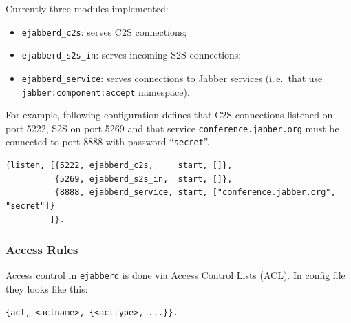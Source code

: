 \documentclass[10pt]{article}
\newcommand{\ejabberd}{\texttt{ejabberd}}
\newcommand{\Jabber}{Jabber}
\begin{document}
Currently three modules implemented:
\begin{itemize}
\item \texttt{ejabberd\_c2s}: serves C2S connections;
\item \texttt{ejabberd\_s2s\_in}: serves incoming S2S connections;
\item \texttt{ejabberd\_service}: serves connections to \Jabber{} services
  (i.\,e.\ that use \texttt{jabber:component:accept} namespace).
\end{itemize}

For example, following configuration defines that C2S connections listened on
port 5222, S2S on port 5269 and that service \texttt{conference.jabber.org}
must be connected to port 8888 with password ``\texttt{secret}''.

\begin{verbatim}
{listen, [{5222, ejabberd_c2s,     start, []},
          {5269, ejabberd_s2s_in,  start, []},
          {8888, ejabberd_service, start, ["conference.jabber.org", "secret"]}
         ]}.
\end{verbatim}


\subsubsection{Access Rules}
\label{sec:configaccess}

Access control in \ejabberd{} is done via Access Control Lists (ACL).  In
config file they looks like this:
\begin{verbatim}
{acl, <aclname>, {<acltype>, ...}}.
\end{verbatim}
\end{document}
